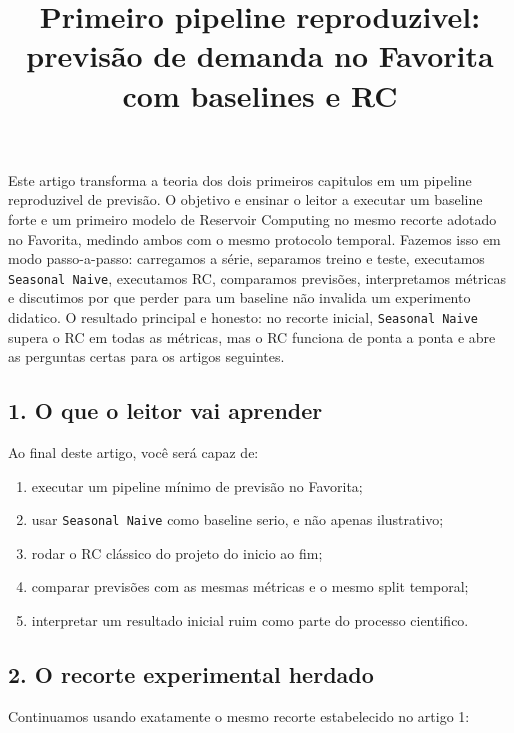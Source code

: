 \documentclass[12pt]{article}
\title{Primeiro pipeline reproduzivel: previsão de demanda no Favorita com baselines e RC}
\author{}
\providecommand{\tightlist}{%
          \setlength{\itemsep}{0pt}\setlength{\parskip}{0pt}}
\begin{document}
        \maketitle

        \begin{resumo}
        Este artigo transforma a teoria dos dois primeiros capitulos em um pipeline reproduzivel de previsão. O objetivo e ensinar o leitor a executar um baseline forte e um primeiro modelo de Reservoir Computing no mesmo recorte adotado no Favorita, medindo ambos com o mesmo protocolo temporal. Fazemos isso em modo passo-a-passo: carregamos a série, separamos treino e teste, executamos \texttt{Seasonal\ Naive}, executamos RC, comparamos previsões, interpretamos métricas e discutimos por que perder para um baseline não invalida um experimento didatico. O resultado principal e honesto: no recorte inicial, \texttt{Seasonal\ Naive} supera o RC em todas as métricas, mas o RC funciona de ponta a ponta e abre as perguntas certas para os artigos seguintes.
        \end{resumo}

        \subsection{1. O que o leitor vai aprender}\label{1-o-que-o-leitor-vai-aprender}

Ao final deste artigo, você será capaz de:

\begin{enumerate}
\def\labelenumi{\arabic{enumi}.}
\tightlist
\item
  executar um pipeline mínimo de previsão no Favorita;
\item
  usar \texttt{Seasonal\ Naive} como baseline serio, e não apenas ilustrativo;
\item
  rodar o RC clássico do projeto do inicio ao fim;
\item
  comparar previsões com as mesmas métricas e o mesmo split temporal;
\item
  interpretar um resultado inicial ruim como parte do processo cientifico.
\end{enumerate}

\subsection{2. O recorte experimental herdado}\label{2-o-recorte-experimental-herdado}

Continuamos usando exatamente o mesmo recorte estabelecido no artigo 1:
\end{document}
